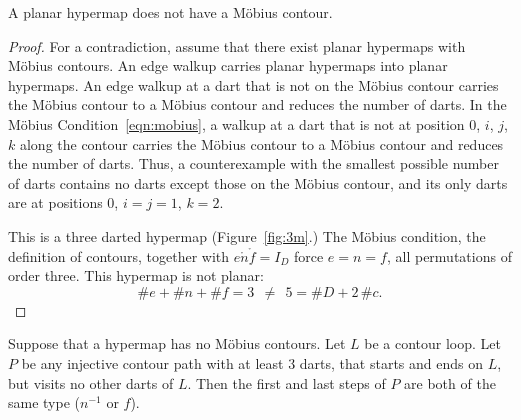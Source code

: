 \begin{lemma}
A planar hypermap does not have a M\"obius contour.
\end{lemma}
%

\begin{proof} For a contradiction, assume that there exist planar
hypermaps with M\"obius contours.  An edge walkup carries
planar hypermaps into planar hypermaps. An edge walkup
at a dart that is not on the M\"obius contour carries the
M\"obius contour to a M\"obius contour 
and reduces the number of darts.  
In the M\"obius Condition~\ref{eqn:mobius},
a walkup at a dart that is not at position $0$, $i$, $j$, $k$
along the contour carries the M\"obius contour to a M\"obius contour
and reduces the number of darts. Thus, a counterexample with
the smallest possible number of darts contains no
darts except those on the M\"obius contour, and its only darts
are at positions $0$, $i=j=1$, $k=2$.

This is a three darted hypermap (Figure~\ref{fig:3m}.)  
The M\"obius condition, the
definition of contours, together with $e\ocirc n\ocirc f=I_D$ force
$e=n=f$, all permutations of order three.  This hypermap is not planar:
\begin{displaymath}\# e + \# n + \# f = 3~~\ne~~ 5 = \# D + 2\,
\#c.\end{displaymath}
\end{proof}



%
%

\begin{lemma}
Suppose that a hypermap has no M\"obius contours. Let $L$ be a
contour loop.  Let $P$ be any injective contour path with at least
$3$ darts, that starts and ends on $L$, but visits no other darts of
$L$.  Then the first and last steps of $P$ are both of the same type
($n^{-1}$ or $f$).
\end{lemma}
%

